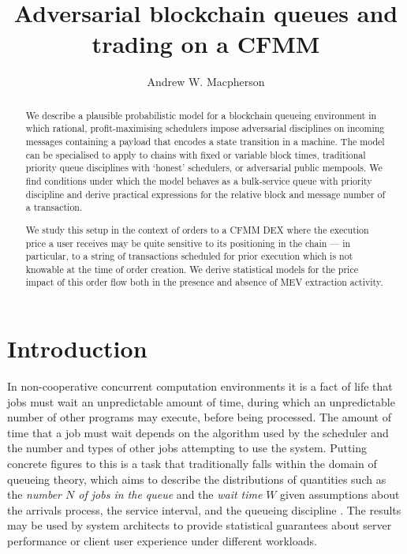 \documentclass[a4paper,11pt]{article}
\title{Adversarial blockchain queues and trading on a CFMM}
\author{Andrew W. Macpherson}
\begin{document}
\maketitle

\begin{abstract}
We describe a plausible probabilistic model for a blockchain queueing environment in which rational, profit-maximising schedulers impose adversarial disciplines on incoming messages containing a payload that encodes a state transition in a machine.
%
The model can be specialised to apply to chains with fixed or variable block times, traditional priority queue disciplines with `honest' schedulers, or adversarial public mempools.
%
We find conditions under which the model behaves as a bulk-service queue with priority discipline and derive practical expressions for the relative block and message number of a transaction.

We study this setup in the context of orders to a CFMM DEX where the execution price a user receives may be quite sensitive to its positioning in the chain --- in particular, to a string of transactions scheduled for prior execution which is not knowable at the time of order creation.
%
We derive statistical models for the price impact of this order flow both in the presence and absence of MEV extraction activity.
\end{abstract}

\section{Introduction}

In non-cooperative concurrent computation environments it is a fact of life that jobs must wait an unpredictable amount of time, during which an unpredictable number of other programs may execute, before being processed.
%
The amount of time that a job must wait depends on the algorithm used by the scheduler and the number and types of other jobs attempting to use the system.
%
Putting concrete figures to this is a task that traditionally falls within the domain of queueing theory, which aims to describe the distributions of quantities such as the \emph{number $N$ of jobs in the queue} and the \emph{wait time} $W$ given assumptions about the arrivals process, the service interval, and the queueing discipline \cite{erlang1909theory,gross2018fundamentals}.
%
The results may be used by system architects to provide statistical guarantees about server performance or client user experience under different workloads.
\end{document}

